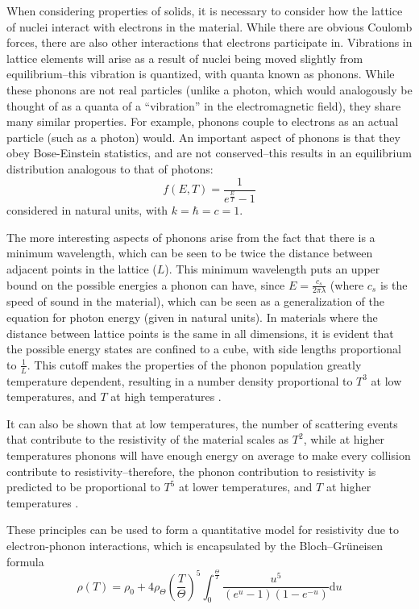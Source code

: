 \documentclass[prl,twocolumn,superscriptaddress,floatfix]{revtex4}
\begin{document}
When considering properties of solids, it is necessary to consider how the lattice of nuclei interact with electrons in the material. While there are obvious Coulomb forces, there are also other interactions that electrons participate in. Vibrations in lattice elements will arise as a result of nuclei being moved slightly from equilibrium–this vibration is quantized, with quanta known as phonons. While these phonons are not real particles (unlike a photon, which would analogously be thought of as a quanta of a “vibration” in the electromagnetic field), they share many similar properties. For example, phonons couple to electrons as an actual particle (such as a photon) would. An important aspect of phonons is that they obey Bose-Einstein statistics, and are not conserved–this results in an equilibrium distribution analogous to that of photons:
\begin{equation}
f(E,T)=\frac{1}{e^{\frac{E}{T} }-1}
\end{equation}
considered in natural units, with $k=\hbar=c=1$. 

The more interesting aspects of phonons arise from the fact that there is a minimum wavelength, which can be seen to be twice the distance between adjacent points in the lattice ($L$). This minimum wavelength puts an upper bound on the possible energies a phonon can have, since $E =\frac{c_{s}}{2\pi \lambda}$ (where $c_s$ is the speed of sound in the material), which can be seen as a generalization of the equation for photon energy (given in natural units). In materials where the distance between lattice points is the same in all dimensions, it is evident that the possible energy states are confined to a cube, with side lengths proportional to $\frac{1}{L}$. This cutoff makes the properties of the phonon population greatly temperature dependent, resulting in a number density proportional to $T^{3}$ at low temperatures, and $T$ at high temperatures \cite{Kittle}.

It can also be shown that at low temperatures, the number of scattering events that contribute to the resistivity of the material scales as $T^2$, while at higher temperatures phonons will have enough energy on average to make every collision contribute to resistivity–therefore, the phonon contribution to resistivity is predicted to be proportional to $T^5$ at lower temperatures, and $T$ at higher temperatures \cite{Kittle}.

These principles can be used to form a quantitative model for resistivity due to electron-phonon interactions, which is encapsulated by the Bloch–Gr\"uneisen formula
\begin{equation}
\rho(T)=\rho_{0}+4\rho_{\Theta}\left(\frac{T}{\Theta}\right)^{5} \int_{0}^{\frac{\Theta}{T}} \frac{u^{5}}{(e^{u}-1)(1-e^{-u})}\text{d}u
\label{bloch-gruneisen}
\end{equation}
\end{document}
